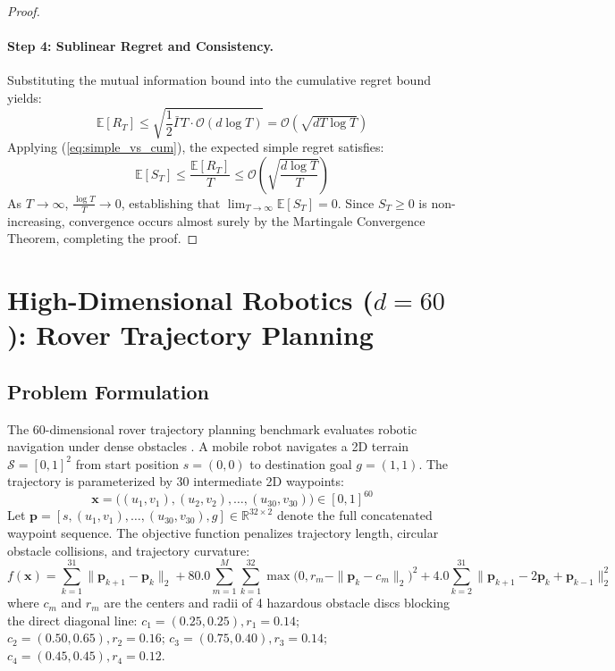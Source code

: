 \documentclass{article}
\begin{document}
\begin{proof}
\paragraph{Step 4: Sublinear Regret and Consistency.}
Substituting the mutual information bound into the cumulative regret bound yields:
\begin{equation}
\mathbb{E}[R_T] \le \sqrt{\frac{1}{2} \bar{\Gamma} T \cdot \mathcal{O}(d \log T)} = \mathcal{O}\left( \sqrt{d T \log T} \right)
\end{equation}
Applying (\ref{eq:simple_vs_cum}), the expected simple regret satisfies:
\begin{equation}
\mathbb{E}[S_T] \le \frac{\mathbb{E}[R_T]}{T} \le \mathcal{O}\left( \sqrt{\frac{d \log T}{T}} \right)
\end{equation}
As $T \to \infty$, $\frac{\log T}{T} \to 0$, establishing that $\lim_{T \to \infty} \mathbb{E}[S_T] = 0$. Since $S_T \ge 0$ is non-increasing, convergence occurs almost surely by the Martingale Convergence Theorem, completing the proof.
\end{proof}

\section{High-Dimensional Robotics ($d=60$): Rover Trajectory Planning}
\label{app:rover_60d}

\subsection{Problem Formulation}
The 60-dimensional rover trajectory planning benchmark evaluates robotic navigation under dense obstacles \citep{wang2018batched,eriksson2019scalable}. A mobile robot navigates a 2D terrain $\mathcal{S} = [0, 1]^2$ from start position $s = (0, 0)$ to destination goal $g = (1, 1)$. The trajectory is parameterized by 30 intermediate 2D waypoints:
\begin{equation}
\mathbf{x} = \big((u_1, v_1), (u_2, v_2), \dots, (u_{30}, v_{30})\big) \in [0, 1]^{60}
\end{equation}
Let $\mathbf{p} = [s, (u_1, v_1), \dots, (u_{30}, v_{30}), g] \in \mathbb{R}^{32 \times 2}$ denote the full concatenated waypoint sequence. The objective function penalizes trajectory length, circular obstacle collisions, and trajectory curvature:
\begin{equation}
f(\mathbf{x}) = \sum_{k=1}^{31} \|\mathbf{p}_{k+1} - \mathbf{p}_k\|_2 + 80.0 \sum_{m=1}^M \sum_{k=1}^{32} \max\big(0, r_m - \|\mathbf{p}_k - c_m\|_2\big)^2 + 4.0 \sum_{k=2}^{31} \|\mathbf{p}_{k+1} - 2\mathbf{p}_k + \mathbf{p}_{k-1}\|_2^2
\end{equation}
where $c_m$ and $r_m$ are the centers and radii of 4 hazardous obstacle discs blocking the direct diagonal line: $c_1 = (0.25, 0.25), r_1 = 0.14$; $c_2 = (0.50, 0.65), r_2 = 0.16$; $c_3 = (0.75, 0.40), r_3 = 0.14$; $c_4 = (0.45, 0.45), r_4 = 0.12$.
\end{document}
